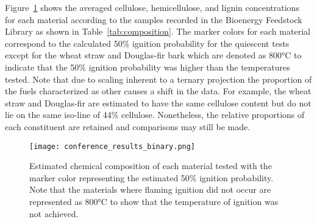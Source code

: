     Figure~\ref{fig:composition_plot} shows the averaged cellulose, hemicellulose, and lignin concentrations for each material according to the samples recorded in the Bioenergy Feedstock Library as shown in Table~\ref{tab:composition}. The marker colors for each material correspond to the calculated 50\% ignition probability for the quiescent tests except for the wheat straw and Douglas-fir bark which are denoted as 800\si{\celsius} to indicate that the 50\% ignition probability was higher than the temperatures tested.  Note that due to scaling inherent to a ternary projection the proportion of the fuels characterized as other causes a shift in the data. For example, the wheat straw and Douglas-fir are estimated to have the same cellulose content but do not lie on the same iso-line of 44\% cellulose. Nonetheless, the relative proportions of each constituent are retained and comparisons may still be made. 
        \begin{figure}[htpb]
            \centering
            \texttt{[image: conference\_results\_binary.png]}
            \caption{Estimated chemical composition of each material tested with the marker color representing the estimated 50\% ignition probability. Note that the materials where flaming ignition did not occur are represented as 800\si{\celsius} to show that the temperature of ignition was not achieved.}
            \label{fig:composition_plot}
        \end{figure}
    
